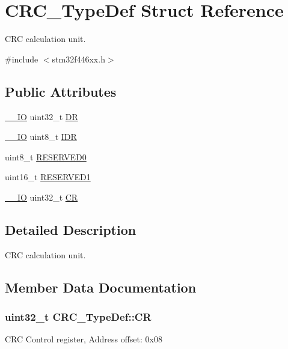 \hypertarget{struct_c_r_c___type_def}{}\section{C\+R\+C\+\_\+\+Type\+Def Struct Reference}
\label{struct_c_r_c___type_def}


C\+RC calculation unit.  




{\ttfamily \#include $<$stm32f446xx.\+h$>$}

\subsection*{Public Attributes}
\begin{DoxyCompactItemize}
\item 
\hyperlink{core__sc300_8h_aec43007d9998a0a0e01faede4133d6be}{\+\_\+\+\_\+\+IO} uint32\+\_\+t \hyperlink{struct_c_r_c___type_def_a50cb22870dbb9001241cec694994e5ef}{DR}
\item 
\hyperlink{core__sc300_8h_aec43007d9998a0a0e01faede4133d6be}{\+\_\+\+\_\+\+IO} uint8\+\_\+t \hyperlink{struct_c_r_c___type_def_ad84e8694cd4b5375ee533c2d875c3b5a}{I\+DR}
\item 
uint8\+\_\+t \hyperlink{struct_c_r_c___type_def_a70dfd1730dba65041550ef55a44db87c}{R\+E\+S\+E\+R\+V\+E\+D0}
\item 
uint16\+\_\+t \hyperlink{struct_c_r_c___type_def_a8b205c6e25b1808ac016db2356b3021d}{R\+E\+S\+E\+R\+V\+E\+D1}
\item 
\hyperlink{core__sc300_8h_aec43007d9998a0a0e01faede4133d6be}{\+\_\+\+\_\+\+IO} uint32\+\_\+t \hyperlink{struct_c_r_c___type_def_af33fa5c173e1c102e6d0242fe60e569f}{CR}
\end{DoxyCompactItemize}


\subsection{Detailed Description}
C\+RC calculation unit. 

\subsection{Member Data Documentation}
\subsubsection[{\texorpdfstring{CR}{CR}}]{ uint32\+\_\+t C\+R\+C\+\_\+\+Type\+Def\+::\+CR}\hypertarget{struct_c_r_c___type_def_af33fa5c173e1c102e6d0242fe60e569f}{}\label{struct_c_r_c___type_def_af33fa5c173e1c102e6d0242fe60e569f}
C\+RC Control register, Address offset\+: 0x08 
